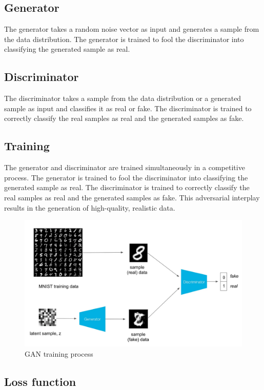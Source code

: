 \documentclass{article}
\begin{document}
		\subsection{Generator}

			The generator takes a random noise vector as input and generates a sample from the data distribution. The generator is trained to fool the discriminator into classifying the generated sample as real.

		\subsection{Discriminator}

			The discriminator takes a sample from the data distribution or a generated sample as input and classifies it as real or fake. The discriminator is trained to correctly classify the real samples as real and the generated samples as fake.

		\subsection{Training}

			The generator and discriminator are trained simultaneously in a competitive process. The generator is trained to fool the discriminator into classifying the generated sample as real. The discriminator is trained to correctly classify the real samples as real and the generated samples as fake. This adversarial interplay results in the generation of high-quality, realistic data.

			\begin{figure}[H]
				\centering
				\includegraphics[width=0.8\linewidth]{images/gan-training.png}
				\caption{GAN training process}
				\label{fig:gan-training}
			\end{figure}

		\subsection{Loss function}
\end{document}

